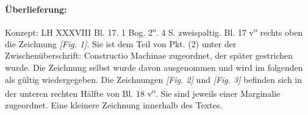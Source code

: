    
        
        \begin{ledgroupsized}[r]{120mm}
        \footnotesize 
        \pstart        
        \noindent\textbf{\"{U}berlieferung:}  
        \pend
        \end{ledgroupsized}
      
       
              \begin{ledgroupsized}[r]{114mm}
              \footnotesize 
              \pstart \parindent -6mm
              Konzept: LH XXXVIII Bl. 17. 1 Bog. 2\textsuperscript{o}. 4 S. zweispaltig. Bl. 17 v\textsuperscript{o} rechts oben die Zeichnung \textit{[Fig. 1]}. Sie ist dem Teil von Pkt. (2) unter der Zwischen\"{u}berschrift: Constructio Machinae zugeordnet, der sp\"{a}ter gestrichen wurde. Die Zeichnung selbst wurde davon ausgenommen und wird im folgenden als g\"{u}ltig wiedergegeben. Die Zeichnungen \textit{[Fig. 2]} und \textit{[Fig. 3]} befinden sich in der unteren rechten H\"{a}lfte von Bl. 18 v\textsuperscript{o}. Sie sind jeweils einer Marginalie zugeordnet. Eine kleinere Zeichnung innerhalb des Textes.\pend
              \end{ledgroupsized}
       
